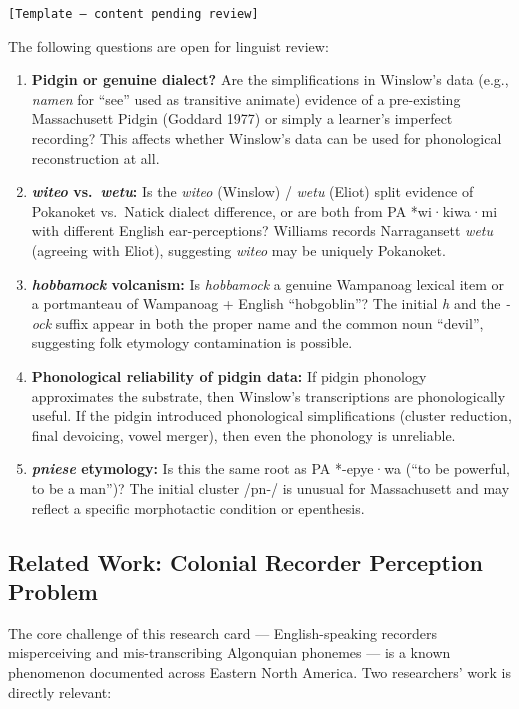\texttt{[Template --- content pending review]}

The following questions are open for linguist review:

\begin{enumerate}
  \item \textbf{Pidgin or genuine dialect?} Are the simplifications in Winslow's
    data (e.g., \emph{namen} for ``see'' used as transitive animate) evidence
    of a pre-existing Massachusett Pidgin (Goddard 1977) or simply a learner's
    imperfect recording? This affects whether Winslow's data can be used for
    phonological reconstruction at all.
  \item \textbf{\emph{witeo} vs.\ \emph{wetu}:} Is the \emph{witeo} (Winslow) /
    \emph{wetu} (Eliot) split evidence of Pokanoket vs.\ Natick dialect
    difference, or are both from PA *wi·kiwa·mi with different English
    ear-perceptions? Williams records Narragansett \emph{wetu} (agreeing with
    Eliot), suggesting \emph{witeo} may be uniquely Pokanoket.
  \item \textbf{\emph{hobbamock} volcanism:} Is \emph{hobbamock} a genuine
    Wampanoag lexical item or a portmanteau of Wampanoag + English
    ``hobgoblin''? The initial \emph{h} and the \emph{-ock} suffix appear in
    both the proper name and the common noun ``devil'', suggesting folk
    etymology contamination is possible.
  \item \textbf{Phonological reliability of pidgin data:} If pidgin phonology
    approximates the substrate, then Winslow's transcriptions are phonologically
    useful. If the pidgin introduced phonological simplifications (cluster
    reduction, final devoicing, vowel merger), then even the phonology is
    unreliable.
  \item \textbf{\emph{pniese} etymology:} Is this the same root as PA
    *-epye·wa (``to be powerful, to be a man'')? The initial cluster /pn-/ is
    unusual for Massachusett and may reflect a specific morphotactic condition
    or epenthesis.
\end{enumerate}

\subsection{Related Work: Colonial Recorder Perception Problem}

The core challenge of this research card --- English-speaking recorders
misperceiving and mis-transcribing Algonquian phonemes --- is a known
phenomenon documented across Eastern North America. Two researchers' work is
directly relevant:

